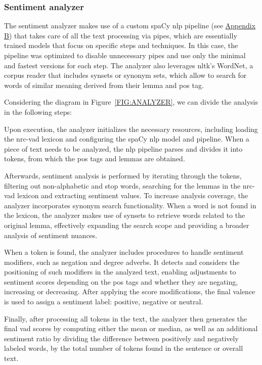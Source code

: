 \subsubsection{Sentiment analyzer\label{SSS:DATASET_SA}}

The sentiment analyzer makes use of a custom spaCy \acs{nlp} pipeline (see \hyperref[FIG:SPACY]{Appendix B}) that takes care of all the text processing via pipes, which are essentially trained models that focus on specific steps and techniques. In this case, the pipeline was optimized to disable unnecessary pipes and use only the minimal and fastest versions for each step. The analyzer also leverages \acs{nltk}'s WordNet, a corpus reader that includes synsets or synonym sets, which allow to search for words of similar meaning derived from their lemma and \acs{pos} tag.

Considering the diagram in Figure~\ref{FIG:ANALYZER}, we can divide the analysis in the following steps:

\begin{compactenum}[\bfseries 1.]
    \item Upon execution, the analyzer initializes the necessary resources, including loading the \acs{nrc}-\acs{vad} lexicon and configuring the spaCy \acs{nlp} model and pipeline. When a piece of text needs to be analyzed, the \acs{nlp} pipeline parses and divides it into tokens, from which the \acs{pos} tags and lemmas are obtained. 

    \item Afterwards, sentiment analysis is performed by iterating through the tokens, filtering out non-alphabetic and stop words, searching for the lemmas in the \acs{nrc}-\acs{vad} lexicon and extracting sentiment values. To increase analysis coverage, the analyzer incorporates synonym search functionality. When a word is not found in the lexicon, the analyzer makes use of synsets to retrieve words related to the original lemma, effectively expanding the search scope and providing a broader analysis of sentiment nuances.

    \item When a token is found, the analyzer includes procedures to handle sentiment modifiers, such as negation and degree adverbs. It detects and considers the positioning of such modifiers in the analyzed text, enabling adjustments to sentiment scores depending on the \acs{pos} tags and whether they are negating, increasing or decreasing. After applying the score modifications, the final valence is used to assign a sentiment label: positive, negative or neutral.

    \item Finally, after processing all tokens in the text, the analyzer then generates the final \acs{vad} scores by computing either the mean or median, as well as an additional sentiment ratio by dividing the difference between positively and negatively labeled words, by the total number of tokens found in the sentence or overall text.
\end{compactenum}

